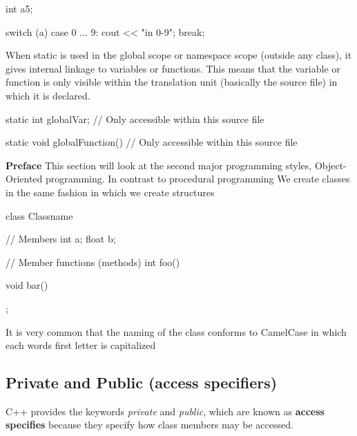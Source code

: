 \documentclass{report}
\begin{document}
    \pagebreak
    \bigbreak \noindent 
    \begin{cppcode}
int a{5};

switch (a) {
    case 0 ... 9: cout << "in 0-9";
    break;
}
    \end{cppcode}

    \bigbreak \noindent 
    \bigbreak \noindent 
    When static is used in the global scope or namespace scope (outside any class), it gives internal linkage to variables or functions. This means that the variable or function is only visible within the translation unit (basically the source file) in which it is declared.
    \bigbreak \noindent 
    \begin{cppcode}
    static int globalVar; // Only accessible within this source file

    static void globalFunction() {
        // Only accessible within this source file
    }
    \end{cppcode}

    \pagebreak
    \bigbreak \noindent 
    \textbf{Preface} This section will look at the second major programming styles, Object-Oriented programming. In contrast to procedural programming
    \bigbreak \noindent 
    We create classes in the same fashion in which we create structures
    \bigbreak \noindent 
    
    \begin{cppcode}
class Classname {

    // Members
    int a;
    float b;

    // Member functions (methods)
    int foo() {

    }

    void bar() {

    }

};
    \end{cppcode}
    
    \bigbreak \noindent 
    It is very common that the naming of the class conforms to CamelCase in which each words first letter is capitalized

    \bigbreak \noindent 
    \subsection{Private and Public (access specifiers)}
    \bigbreak \noindent 
    C++ provides the keywords \textit{private} and \textit{public}, which are known as \textbf{access specifies} because they specify how class members may be accessed. 
    \bigbreak \noindent 
    
\end{document}
